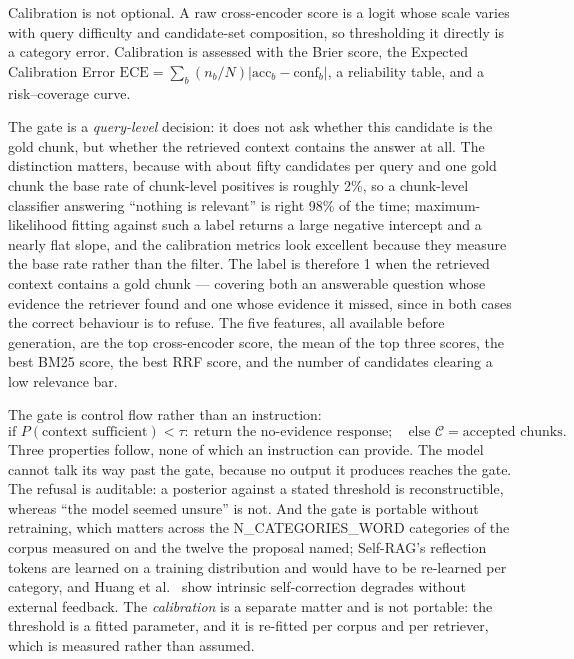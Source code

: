 \documentclass[preprint,3p,times]{elsarticle}
\begin{document}
Calibration is not optional. A raw cross-encoder score is a logit whose scale
varies with query difficulty and candidate-set composition, so thresholding it
directly is a category error. Calibration is assessed with the Brier score, the
Expected Calibration Error
$\mathrm{ECE}=\sum_b (n_b/N)\lvert \mathrm{acc}_b-\mathrm{conf}_b\rvert$, a
reliability table, and a risk--coverage curve.

The gate is a \emph{query-level} decision: it does not ask whether this
candidate is the gold chunk, but whether the retrieved context contains the
answer at all. The distinction matters, because with
about fifty candidates per query and one gold chunk the base rate of
chunk-level positives is roughly 2\%, so a chunk-level classifier answering
``nothing is relevant'' is right 98\% of the time; maximum-likelihood fitting
against such a label returns a large negative intercept and a nearly flat
slope, and the calibration metrics look excellent because they measure the
base rate rather than the filter. The label is therefore 1 when the retrieved
context contains a gold chunk --- covering both an answerable question whose
evidence the retriever found and one whose evidence it missed, since in both
cases the correct behaviour is to refuse. The five features, all available
before generation, are the top cross-encoder score, the mean of the top three
scores, the best BM25 score, the best RRF score, and the number of candidates
clearing a low relevance bar.

The gate is control flow rather than an instruction:
\begin{equation}
\text{if }P(\text{context sufficient})<\tau:\ \text{return the no-evidence response};
\quad\text{else }\mathcal{C}=\text{accepted chunks}.
\end{equation}
Three properties follow, none of which an instruction can provide. The model
cannot talk its way past the gate, because no output it produces reaches the
gate. The refusal is auditable: a posterior against a stated threshold is
reconstructible, whereas ``the model seemed unsure'' is not. And the gate is
portable without retraining, which matters across the
{{N_CATEGORIES_WORD}} categories of the corpus measured on and the twelve the
proposal named; Self-RAG's reflection tokens are learned on a training
distribution and would have to be re-learned per category, and Huang
et al.~\cite{huang2024selfcorrect} show intrinsic self-correction degrades
without external feedback. The \emph{calibration} is a separate matter and is
not portable: the threshold is a fitted parameter, and it is re-fitted per
corpus and per retriever, which is measured rather than assumed.
\end{document}
